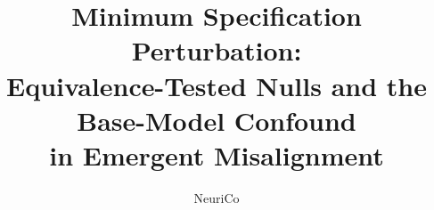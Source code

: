 \documentclass{article}
\title{Minimum Specification Perturbation:\\Equivalence-Tested Nulls and the Base-Model Confound\\in Emergent Misalignment}
\author{NeuriCo}
\begin{document}
\maketitle

\begin{abstract}

\end{abstract}










\appendix

\end{document}
